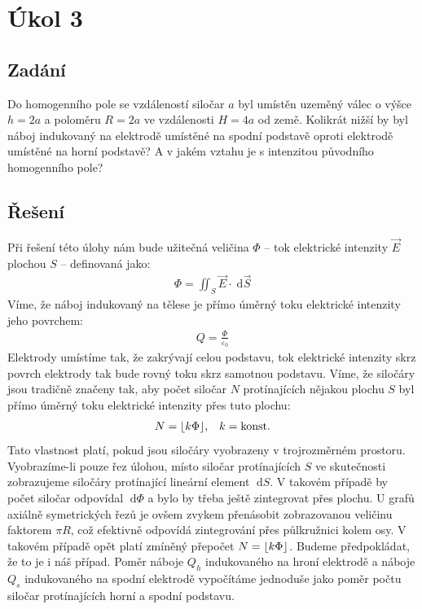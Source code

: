 \documentclass[10pt,a4paper]{article}
\DeclarePairedDelimiter\floor{\lfloor}{\rfloor}
\newcommand{\const}[1]{\text{#1}}
\renewcommand{\d}[1]{\;\const{d}#1}
\begin{document}
\section*{Úkol 3}

\subsection*{Zadání}
Do homogenního pole se vzdáleností siločar $a$ byl umístěn uzeměný válec o výšce $h=2a$ a poloměru $R=2a$ ve vzdálenosti $H=4a$ od země. Kolikrát nižší by byl náboj indukovaný na elektrodě umístěné na spodní podstavě oproti elektrodě umístěné na horní podstavě? A v jakém vztahu je s intenzitou původního homogenního pole?

\subsection*{Řešení}
Při řešení této úlohy nám bude užitečná veličina $\Phi$ – tok elektrické intenzity $\vec{E}$ plochou $S$ – definovaná jako:
\begin{align*}
    \Phi = \iint_S \vec{E} \cdot \d{\vec{S}}
\end{align*}
Víme, že náboj indukovaný na tělese je přímo úměrný toku elektrické intenzity jeho povrchem:
\begin{align*}
    Q = \frac{\Phi}{\varepsilon_0}
\end{align*}
Elektrody umístíme tak, že zakrývají celou podstavu, tok elektrické intenzity skrz povrch elektrody tak bude rovný toku skrz samotnou podstavu. Víme, že siločáry jsou tradičně značeny tak, aby počet siločar $N$ protínajících nějakou plochu $S$ byl přímo úměrný toku elektrické intenzity přes tuto plochu:
\begin{align*}
    N = \floor{k\Phi}, \;\;\; k = \const{konst.}
\end{align*}
Tato vlastnost platí, pokud jsou siločáry vyobrazeny v trojrozměrném prostoru. Vyobrazíme-li pouze řez úlohou, místo siločar protínajících $S$ ve skutečnosti zobrazujeme siločáry protínající lineární element $\d{S}$. V takovém případě by počet siločar odpovídal $\d{\Phi}$ a bylo by třeba ještě zintegrovat přes plochu.
U grafů axiálně symetrických řezů je ovšem zvykem přenásobit zobrazovanou veličinu faktorem $\pi R$, což efektivně odpovídá zintegrování přes půlkružnici kolem osy. V takovém případě opět platí zmíněný přepočet $N = \floor{k\Phi}$. Budeme předpokládat, že to je i náš případ. Poměr náboje $Q_h$ indukovaného na hroní elektrodě a náboje $Q_s$ indukovaného na spodní elektrodě vypočítáme jednoduše jako poměr počtu siločar protínajících horní a spodní podstavu.
\end{document}
